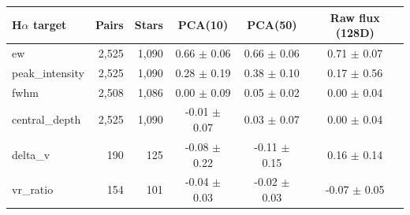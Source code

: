 \begin{tabular}{lrrccc}
  \toprule
  H$\alpha$ target & Pairs & Stars & PCA(10) & PCA(50) & Raw flux (128D) \\
  \midrule
  ew               & 2{,}525 & 1{,}090 & 0.66 $\pm$ 0.06 & 0.66 $\pm$ 0.06 & 0.71 $\pm$ 0.07 \\
  peak\_intensity  & 2{,}525 & 1{,}090 & 0.28 $\pm$ 0.19 & 0.38 $\pm$ 0.10 & 0.17 $\pm$ 0.56 \\
  fwhm             & 2{,}508 & 1{,}086 & 0.00 $\pm$ 0.09 & 0.05 $\pm$ 0.02 & 0.00 $\pm$ 0.04 \\
  central\_depth   & 2{,}525 & 1{,}090 & -0.01 $\pm$ 0.07 & 0.03 $\pm$ 0.07 & 0.00 $\pm$ 0.04 \\
  delta\_v         & 190 & 125 & -0.08 $\pm$ 0.22 & -0.11 $\pm$ 0.15 & 0.16 $\pm$ 0.14 \\
  vr\_ratio        & 154 & 101 & -0.04 $\pm$ 0.03 & -0.02 $\pm$ 0.03 & -0.07 $\pm$ 0.05 \\
  \bottomrule
\end{tabular}
